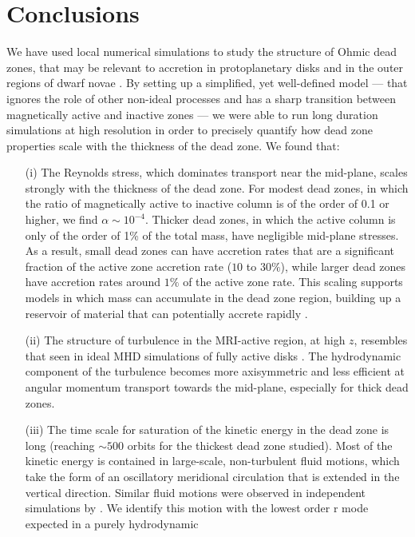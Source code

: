 \section{Conclusions}
We have used local numerical simulations to study the structure of Ohmic dead zones, that may be relevant to 
accretion in protoplanetary disks \citep{gammie96} and in the outer regions of dwarf novae \citep{gammie98}. 
By setting up a simplified, yet well-defined model --- that ignores the role of other non-ideal processes and has a sharp 
transition between magnetically active and inactive zones --- we were able to run long duration simulations at high 
resolution in order to precisely quantify how dead zone properties scale with the thickness of the dead zone. We found that:
\begin{itemize}
\item[(i)]
The Reynolds stress, which dominates transport near the mid-plane, scales strongly with the thickness of the 
dead zone. For modest dead zones, in which the ratio of magnetically active to inactive column is of the order of 
0.1 or higher, we find $\alpha \sim 10^{-4}$. Thicker dead zones, in which the active column is only of the order of 
1\% of the total mass, have negligible mid-plane stresses. As a result, small dead zones can have accretion rates that are a significant fraction of the active zone accretion rate ($10$ to $30\%$), while larger dead zones have accretion rates around $1\%$ of the active zone rate.  This scaling supports models in which mass can 
accumulate in the dead zone region, building up a reservoir of material that can potentially accrete 
rapidly \citep{armitage01,zhu09,martin11}.
\item[(ii)]
The structure of turbulence in the MRI-active region, at high $z$, resembles that seen in ideal MHD 
simulations of fully active disks \citep{guan09,simon12}. The hydrodynamic component of the turbulence  
becomes more axisymmetric and less efficient at angular momentum transport towards the mid-plane, 
especially for thick dead zones.
\item[(iii)]
The time scale for saturation of the kinetic energy in the dead zone is long (reaching $\sim 500$ orbits 
for the thickest dead zone studied). Most of the kinetic energy is contained in large-scale, non-turbulent 
fluid motions, which take the form of an oscillatory meridional circulation that is extended in the 
vertical direction. Similar fluid motions were observed in independent simulations by 
\cite{oishi09}. We identify this motion with the lowest order r mode expected in a purely hydrodynamic 

\end{itemize}
